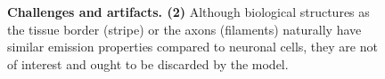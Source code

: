 \begin{landscape}
\begin{figure}[ht]\ContinuedFloat
    \centering
    \caption{\textbf{Challenges and artifacts. (2)}
    Although biological structures as the tissue border (stripe) or the axons (filaments) naturally have similar emission properties compared to neuronal cells, they are not of interest and ought to be discarded by the model.
    }
\end{figure}%


\end{landscape}
